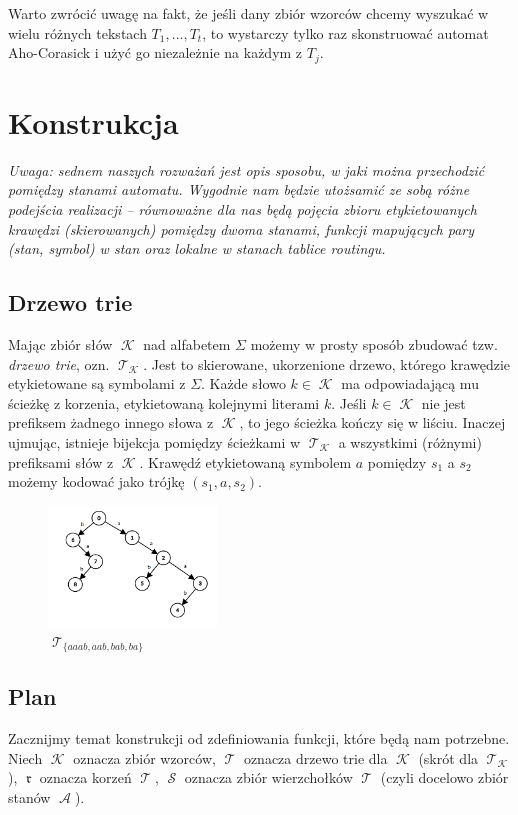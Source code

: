 \documentclass{article}
\DeclareMathOperator{\rot}{\mathfrak{r}}
\DeclareMathOperator{\K}{\mathcal{K}}
\DeclareMathOperator{\A}{\mathcal{A}}
\DeclareMathOperator{\states}{\mathcal{S}}
\DeclareMathOperator{\trie}{\mathcal{T}}
\begin{document}
Warto zwrócić uwagę na fakt, że jeśli dany zbiór wzorców chcemy wyszukać w wielu różnych tekstach $T_1,...,T_t$, to wystarczy tylko raz skonstruować automat Aho-Corasick i użyć go niezależnie na każdym z $T_j$.

\section{Konstrukcja}
\textit{Uwaga: sednem naszych rozważań jest opis sposobu, w jaki można przechodzić pomiędzy stanami automatu. Wygodnie nam będzie utożsamić ze sobą różne podejścia realizacji -- równoważne dla nas będą pojęcia zbioru etykietowanych krawędzi (skierowanych) pomiędzy dwoma stanami, funkcji mapujących pary (stan, symbol) w stan oraz lokalne w stanach tablice routingu.}

\subsection{Drzewo trie}
Mając zbiór słów $\K$ nad alfabetem $\Sigma$ możemy w prosty sposób zbudować tzw. \textit{drzewo trie}, ozn. $\trie_{\K}$. Jest to skierowane, ukorzenione drzewo, którego krawędzie etykietowane są symbolami z $\Sigma$. Każde słowo $k\in\K$ ma odpowiadającą mu ścieżkę z korzenia, etykietowaną kolejnymi literami $k$. Jeśli $k\in\K$ nie jest prefiksem żadnego innego słowa z $\K$, to jego ścieżka kończy się w liściu. Inaczej ujmując, istnieje bijekcja pomiędzy ścieżkami w $\trie_{\K}$ a wszystkimi (różnymi) prefiksami słów z $\K$. Krawędź etykietowaną symbolem $a$ pomiędzy $s_1$ a $s_2$ możemy kodować jako trójkę $(s_1, a, s_2)$.

\begin{figure}[h!]
    \centering
    \includegraphics[width=0.4\textwidth]{trie.png}
    \caption{$\trie_{\{aaab, aab, bab, ba\}}$}
    \label{fig:trie}
\end{figure}

\subsection{Plan}
Zacznijmy temat konstrukcji od zdefiniowania funkcji, które będą nam potrzebne. Niech $\K$ oznacza zbiór wzorców, $\trie$ oznacza drzewo trie dla $\K$ (skrót dla $\trie_{\K}$), $\rot$ oznacza korzeń $\trie$, $\states$ oznacza zbiór wierzchołków $\trie$ (czyli docelowo zbiór stanów $\A$).
\end{document}
